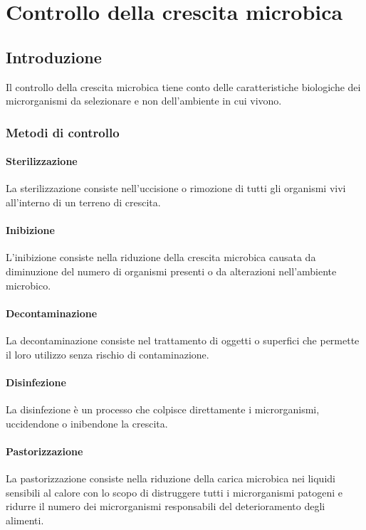 \chapter{Controllo della crescita microbica}

\section{Introduzione}
Il controllo della crescita microbica tiene conto delle caratteristiche biologiche dei microrganismi da selezionare e non dell'ambiente in cui vivono. 
	
	\subsection{Metodi di controllo}

		\subsubsection{Sterilizzazione}
		La sterilizzazione consiste nell'uccisione o rimozione di tutti gli organismi vivi all'interno di un terreno di crescita.

		\subsubsection{Inibizione}
		L'inibizione consiste nella riduzione della crescita microbica causata da diminuzione del numero di organismi presenti o da alterazioni nell'ambiente microbico.

		\subsubsection{Decontaminazione}
		La decontaminazione consiste nel trattamento di oggetti o superfici che permette il loro utilizzo senza rischio di contaminazione.

		\subsubsection{Disinfezione}
		La disinfezione \`e un processo che colpisce direttamente i microrganismi, uccidendone o inibendone la crescita.

		\subsubsection{Pastorizzazione}
		La pastorizzazione consiste nella riduzione della carica microbica nei liquidi sensibili al calore con lo scopo di distruggere tutti i microrganismi patogeni e ridurre il numero dei microrganismi responsabili del deterioramento degli alimenti.

